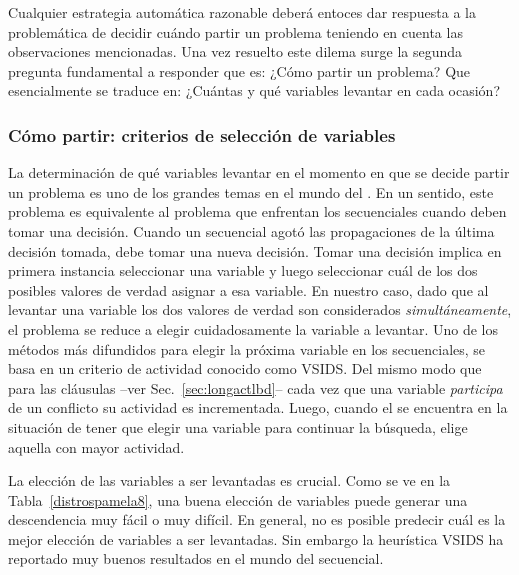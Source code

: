 Cualquier estrategia automática razonable deberá entoces dar respuesta a la
problemática de decidir cuándo partir un problema teniendo en cuenta las
observaciones mencionadas. Una vez resuelto este dilema surge la segunda
pregunta fundamental a responder que es: ¿Cómo partir un problema? Que
esencialmente se traduce en: ¿Cuántas y qué variables levantar en cada ocasión?

\subsubsection{Cómo partir: criterios de selección de variables}

\newcommand{\vsids}{VSIDS\xspace}

La determinación de qué variables levantar en el momento en que se decide
partir un problema es uno de los grandes temas en el mundo del \ssolving. En
un sentido, este problema es equivalente al problema que enfrentan los
\ssolver secuenciales cuando deben tomar una decisión. Cuando un \ssolver
secuencial agotó las propagaciones de la última decisión tomada, debe tomar
una nueva decisión. Tomar una decisión implica en primera instancia
seleccionar una variable y luego seleccionar cuál de los dos posibles valores
de verdad asignar a esa variable. En nuestro caso, dado que al levantar una
variable los dos valores de verdad son considerados \emph{simultáneamente}, el
problema se reduce a elegir cuidadosamente la variable a levantar. Uno de los
métodos más difundidos para elegir la próxima variable en los \ssolvers
secuenciales, se basa en un criterio de actividad conocido como \vsids. Del
mismo modo que para las cláusulas --ver Sec.~\ref{sec:longactlbd}-- cada vez que
una variable \emph{participa} de un conflicto su actividad es incrementada.
Luego, cuando el \ssolver se encuentra en la situación de tener que elegir una
variable para continuar la búsqueda, elige aquella con mayor actividad.

La elección de las variables a ser levantadas es crucial. Como se ve en
la Tabla~\ref{distrospamela8}, una buena elección de variables puede generar una
descendencia muy fácil o muy difícil. En general, no es posible predecir cuál es
la mejor elección de variables a ser levantadas. Sin embargo la heurística
\vsids ha reportado muy buenos resultados en el mundo del \ssolving secuencial.


